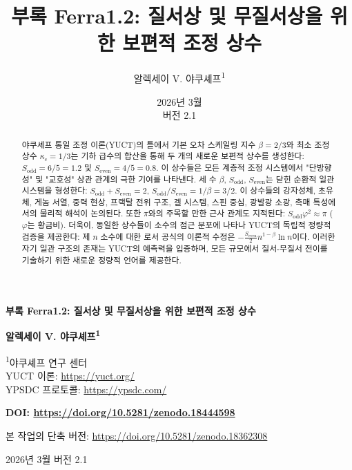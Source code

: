 \documentclass[11pt,a4paper]{article}
\begin{document}
	
	\title{부록 Ferra1.2: 질서상 및 무질서상을 위한 보편적 조정 상수}
	\author{알렉세이 V. 야쿠셰프\textsuperscript{1}}
	\date{2026년 3월 \\ 버전 2.1}
	
	\begin{titlepage}
		\begin{center}
			\vspace*{0.5cm}
			\Huge\textbf{부록 Ferra1.2: 질서상 및 무질서상을 위한 보편적 조정 상수}
			\vspace{0.8cm}
			
			\Large\textbf{알렉세이 V. 야쿠셰프\textsuperscript{1}}
			\vspace{0.3cm}
			
			\large
			\textsuperscript{1}야쿠셰프 연구 센터 \\
			YUCT 이론: \url{https://yuct.org/} \\
			YPSDC 프로토콜: \url{https://ypsdc.com/}
			\vspace{0.5cm}
			
			\textbf{DOI: \url{https://doi.org/10.5281/zenodo.18444598}}
			\vspace{0.3cm}
			
			\large
			본 작업의 단축 버전: \url{https://doi.org/10.5281/zenodo.18362308}
			\vspace{0.3cm}
			
			\large
			2026년 3월 \; 버전 2.1
			\vspace{0.5cm}
			
			\begin{minipage}{0.92\textwidth}
				\small
				\begin{abstract}
					\noindent
					야쿠셰프 통일 조정 이론(YUCT)의 틀에서 기본 오차 스케일링 지수 \(\beta = 2/3\)와 최소 조정 상수 \(\kappa_c = 1/3\)는 기하 급수의 합산을 통해 두 개의 새로운 보편적 상수를 생성한다:
					\(S_{\text{odd}} = 6/5 = 1.2\) 및 \(S_{\text{even}} = 4/5 = 0.8\).
					이 상수들은 모든 계층적 조정 시스템에서 "단방향성" 및 "교호성" 상관 관계의 극한 기여를 나타낸다. 세 수 \(\beta\), \(S_{\text{odd}}\), \(S_{\text{even}}\)는 닫힌 순환적 일관 시스템을 형성한다:
					\(S_{\text{odd}}+S_{\text{even}} = 2\), \(S_{\text{odd}}/S_{\text{even}} = 1/\beta = 3/2\).
					이 상수들의 강자성체, 초유체, 게놈 서열, 중력 현상, 프랙탈 전위 구조, 겔 시스템, 스핀 중심, 광발광 소광, 촉매 특성에서의 물리적 해석이 논의된다. 또한 \(\pi\)와의 주목할 만한 근사 관계도 지적된다: \(S_{\text{odd}}\varphi^2 \approx \pi\) (\(\varphi\)는 황금비).
					더욱이, 동일한 상수들이 소수의 점근 분포에 나타나 YUCT의 독립적 정량적 검증을 제공한다: 제 \(n\) 소수에 대한 로서 공식의 이론적 수정은 \(-\frac{S_{\text{even}}}{2}n^{1-\beta}\ln n\)이다. 이러한 자기 일관 구조의 존재는 YUCT의 예측력을 입증하며, 모든 규모에서 질서-무질서 전이를 기술하기 위한 새로운 정량적 언어를 제공한다.
				\end{abstract}
			\end{minipage}
			

\end{center}
\end{titlepage}
\end{document}
